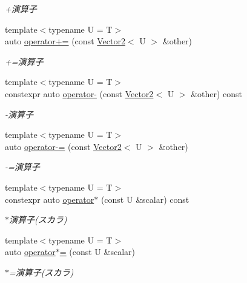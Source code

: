 \begin{DoxyCompactItemize}
\begin{DoxyCompactList}\small\item\em +演算子 \end{DoxyCompactList}\item 
{\footnotesize template$<$typename U  = T$>$ }\\auto \mbox{\hyperlink{classsaki_1_1_vector2_aa76ccb2d2228441d510dca7781f785d3}{operator+=}} (const \mbox{\hyperlink{classsaki_1_1_vector2}{Vector2}}$<$ U $>$ \&other)
\begin{DoxyCompactList}\small\item\em +=演算子 \end{DoxyCompactList}\item 
{\footnotesize template$<$typename U  = T$>$ }\\constexpr auto \mbox{\hyperlink{classsaki_1_1_vector2_a4be4c970957e552bdd98fa37ef4f14df}{operator-\/}} (const \mbox{\hyperlink{classsaki_1_1_vector2}{Vector2}}$<$ U $>$ \&other) const
\begin{DoxyCompactList}\small\item\em -\/演算子 \end{DoxyCompactList}\item 
{\footnotesize template$<$typename U  = T$>$ }\\auto \mbox{\hyperlink{classsaki_1_1_vector2_aaf222bfb3a2e02a1570ce2e90c41fdd0}{operator-\/=}} (const \mbox{\hyperlink{classsaki_1_1_vector2}{Vector2}}$<$ U $>$ \&other)
\begin{DoxyCompactList}\small\item\em -\/=演算子 \end{DoxyCompactList}\item 
{\footnotesize template$<$typename U  = T$>$ }\\constexpr auto \mbox{\hyperlink{classsaki_1_1_vector2_aaaac42e1c348c453fad5ac0f2b7029d7}{operator$\ast$}} (const U \&scalar) const
\begin{DoxyCompactList}\small\item\em $\ast$演算子(スカラ) \end{DoxyCompactList}\item 
{\footnotesize template$<$typename U  = T$>$ }\\auto \mbox{\hyperlink{classsaki_1_1_vector2_aab202f42563239dfb59d27295d6c7462}{operator$\ast$=}} (const U \&scalar)
\begin{DoxyCompactList}\small\item\em $\ast$=演算子(スカラ) \end{DoxyCompactList}\item 

\end{DoxyCompactItemize}
